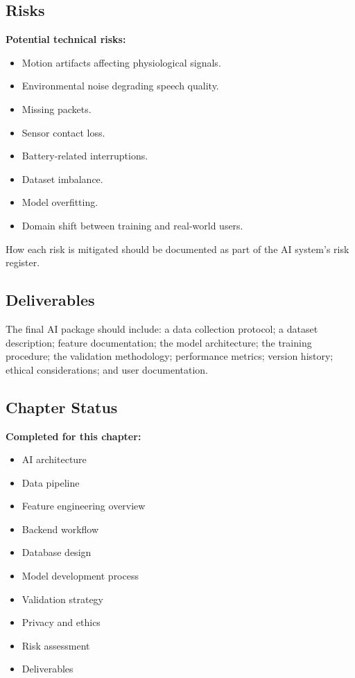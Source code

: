 \subsection{Risks}
\label{sec:risks-ch7}

\begin{observationbox}
\textbf{Potential technical risks:}
\begin{itemize}
    \item Motion artifacts affecting physiological signals.
    \item Environmental noise degrading speech quality.
    \item Missing packets.
    \item Sensor contact loss.
    \item Battery-related interruptions.
    \item Dataset imbalance.
    \item Model overfitting.
    \item Domain shift between training and real-world users.
\end{itemize}
\end{observationbox}

\begin{futureworkbox}
How each risk is mitigated should be documented as part of the AI system's risk register.
\end{futureworkbox}

\subsection{Deliverables}
\label{sec:deliverables-ch7}

The final AI package should include: a data collection protocol; a dataset description; feature documentation; the model architecture; the training procedure; the validation methodology; performance metrics; version history; ethical considerations; and user documentation.

\subsection{Chapter Status}
\label{sec:ch7-status}

\begin{validationbox}
\textbf{Completed for this chapter:}
\begin{itemize}
    \item AI architecture
    \item Data pipeline
    \item Feature engineering overview
    \item Backend workflow
    \item Database design
    \item Model development process
    \item Validation strategy
    \item Privacy and ethics
    \item Risk assessment
    \item Deliverables
\end{itemize}
\end{validationbox}
